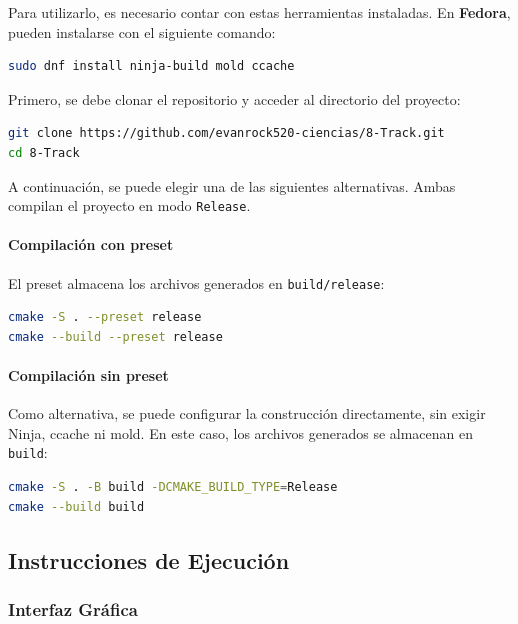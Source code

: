 Para utilizarlo, es necesario contar con estas herramientas instaladas.
En \textbf{Fedora}, pueden instalarse con el siguiente comando:

\begin{lstlisting}[language=bash]
sudo dnf install ninja-build mold ccache
\end{lstlisting}

Primero, se debe clonar el repositorio y acceder al directorio del proyecto:

\begin{lstlisting}[language=bash]
git clone https://github.com/evanrock520-ciencias/8-Track.git
cd 8-Track
\end{lstlisting}

A continuación, se puede elegir una de las siguientes alternativas.
Ambas compilan el proyecto en modo \texttt{Release}.

\paragraph{Compilación con preset}

El preset almacena los archivos generados en \texttt{build/release}:

\begin{lstlisting}[language=bash]
cmake -S . --preset release
cmake --build --preset release
\end{lstlisting}

\paragraph{Compilación sin preset}

Como alternativa, se puede configurar la construcción directamente,
sin exigir Ninja, ccache ni mold. En este caso, los archivos generados
se almacenan en \texttt{build}:

\begin{lstlisting}[language=bash]
cmake -S . -B build -DCMAKE_BUILD_TYPE=Release
cmake --build build
\end{lstlisting}

\subsection{Instrucciones de Ejecución}

\subsubsection*{Interfaz Gráfica}

